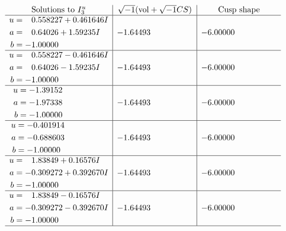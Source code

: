 \documentclass[1p]{elsarticle_modified}
\theoremstyle{definition}
\newcommand{\I}{\sqrt{-1}}
\begin{document}
$$\begin{array}{c|c|c}  
\text{Solutions to }I^u_{3}& \I (\text{vol} + \sqrt{-1}CS) & \text{Cusp shape}\\
 \hline 
\begin{aligned}
u &= \phantom{-}0.558227 + 0.461646 I \\
a &= \phantom{-}0.64026 + 1.59235 I \\
b &= -1.00000\phantom{ +0.000000I}\end{aligned}
 & -1.64493\phantom{ +0.000000I} & -6.00000\phantom{ +0.000000I} \\ \hline\begin{aligned}
u &= \phantom{-}0.558227 - 0.461646 I \\
a &= \phantom{-}0.64026 - 1.59235 I \\
b &= -1.00000\phantom{ +0.000000I}\end{aligned}
 & -1.64493\phantom{ +0.000000I} & -6.00000\phantom{ +0.000000I} \\ \hline\begin{aligned}
u &= -1.39152\phantom{ +0.000000I} \\
a &= -1.97338\phantom{ +0.000000I} \\
b &= -1.00000\phantom{ +0.000000I}\end{aligned}
 & -1.64493\phantom{ +0.000000I} & -6.00000\phantom{ +0.000000I} \\ \hline\begin{aligned}
u &= -0.401914\phantom{ +0.000000I} \\
a &= -0.688603\phantom{ +0.000000I} \\
b &= -1.00000\phantom{ +0.000000I}\end{aligned}
 & -1.64493\phantom{ +0.000000I} & -6.00000\phantom{ +0.000000I} \\ \hline\begin{aligned}
u &= \phantom{-}1.83849 + 0.16576 I \\
a &= -0.309272 + 0.392670 I \\
b &= -1.00000\phantom{ +0.000000I}\end{aligned}
 & -1.64493\phantom{ +0.000000I} & -6.00000\phantom{ +0.000000I} \\ \hline\begin{aligned}
u &= \phantom{-}1.83849 - 0.16576 I \\
a &= -0.309272 - 0.392670 I \\
b &= -1.00000\phantom{ +0.000000I}\end{aligned}
 & -1.64493\phantom{ +0.000000I} & -6.00000\phantom{ +0.000000I}\\
 \hline 
 \end{array}$$\newpage\newpage\renewcommand{\arraystretch}{1}
\end{document}
